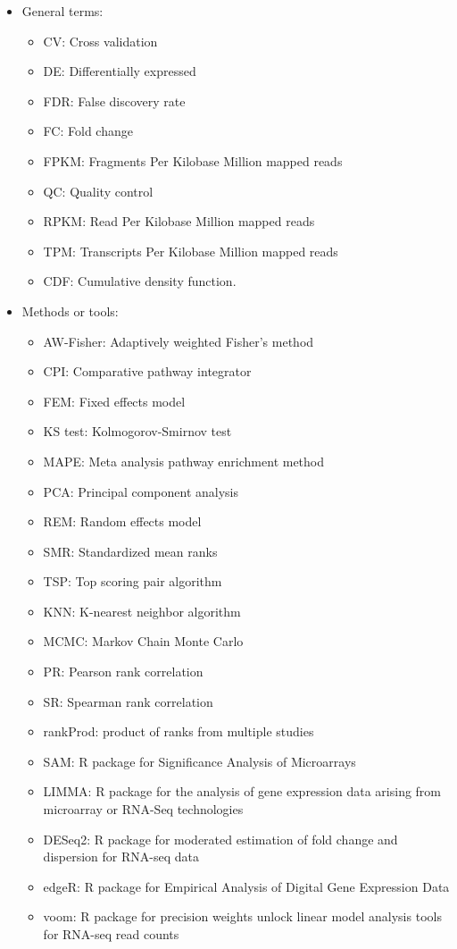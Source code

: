 \begin{itemize}
\item General terms:
\begin{itemize}
\item CV: Cross validation
\item DE:  Differentially expressed
\item FDR: False discovery rate
\item FC: Fold change
\item FPKM: Fragments Per Kilobase Million mapped reads
\item QC: Quality control
\item RPKM: Read Per Kilobase Million mapped reads
\item TPM: Transcripts Per Kilobase Million mapped reads
\item CDF: Cumulative density function.
\end{itemize}

\item Methods or tools:
\begin{itemize}
\item AW-Fisher: Adaptively weighted Fisher's method
\item CPI: Comparative pathway integrator 
\item FEM: Fixed effects model
\item KS test: Kolmogorov-Smirnov test
\item MAPE: Meta analysis pathway enrichment method
\item PCA: Principal component analysis
\item REM: Random effects model
\item SMR: Standardized mean ranks
\item TSP: Top scoring pair algorithm
\item KNN: K-nearest neighbor algorithm
\item MCMC: Markov Chain Monte Carlo
\item PR: Pearson rank correlation
\item SR: Spearman rank correlation
\item rankProd: product of ranks from multiple studies
\item SAM: R package for Significance Analysis of Microarrays
\item LIMMA: R package for the analysis of gene expression data arising from microarray or RNA-Seq technologies
\item DESeq2: R package for moderated estimation of fold change and dispersion for RNA-seq data
\item edgeR: R package for Empirical Analysis of Digital Gene Expression Data
\item voom: R package for precision weights unlock linear model analysis tools for RNA-seq read counts

\end{itemize}

\end{itemize}


